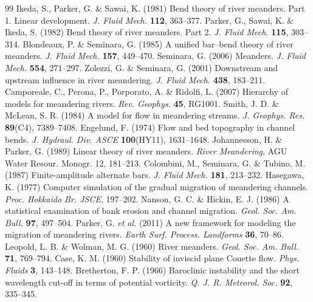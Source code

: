 \documentclass[11pt]{article}
\begin{document}
\begin{thebibliography}{99}
 Ikeda, S., Parker, G. \& Sawai, K. (1981) Bend theory of river
  meanders. Part 1. Linear development. \emph{J. Fluid Mech.} \textbf{112}, 363--377.
 Parker, G., Sawai, K. \& Ikeda, S. (1982) Bend theory of river
  meanders. Part 2. \emph{J. Fluid Mech.} \textbf{115}, 303--314.
 Blondeaux, P. \& Seminara, G. (1985) A unified bar--bend
  theory of river meanders. \emph{J. Fluid Mech.} \textbf{157}, 449--470.
 Seminara, G. (2006) Meanders. \emph{J. Fluid Mech.}
  \textbf{554}, 271--297.
 Zolezzi, G. \& Seminara, G. (2001) Downstream and upstream
  influence in river meandering. \emph{J. Fluid Mech.} \textbf{438}, 183--211.
 Camporeale, C., Perona, P., Porporato, A. \& Ridolfi, L.
  (2007) Hierarchy of models for meandering rivers. \emph{Rev. Geophys.} \textbf{45}, RG1001.
 Smith, J. D. \& McLean, S. R. (1984) A model for flow in
  meandering streams. \emph{J. Geophys. Res.} \textbf{89}(C4), 7389--7408.
 Engelund, F. (1974) Flow and bed topography in channel bends.
  \emph{J. Hydraul. Div. ASCE} \textbf{100}(HY11), 1631--1648.
 Johannesson, H. \& Parker, G. (1989) Linear theory of river
  meanders. \emph{River Meandering}, AGU Water Resour. Monogr. 12, 181--213.
 Colombini, M., Seminara, G. \& Tubino, M. (1987)
  Finite-amplitude alternate bars. \emph{J. Fluid Mech.} \textbf{181}, 213--232.
 Hasegawa, K. (1977) Computer simulation of the gradual
  migration of meandering channels. \emph{Proc. Hokkaido Br. JSCE}, 197--202.
 Nanson, G. C. \& Hickin, E. J. (1986) A statistical examination
  of bank erosion and channel migration. \emph{Geol. Soc. Am. Bull.} \textbf{97}, 497--504.
 Parker, G. \emph{et al.} (2011) A new framework for modeling the
  migration of meandering rivers. \emph{Earth Surf. Process. Landforms} \textbf{36}, 70--86.
 Leopold, L. B. \& Wolman, M. G. (1960) River meanders.
  \emph{Geol. Soc. Am. Bull.} \textbf{71}, 769--794.
 Case, K. M. (1960) Stability of inviscid plane Couette flow.
  \emph{Phys. Fluids} \textbf{3}, 143--148.
 Bretherton, F. P. (1966) Baroclinic instability and the
  short wavelength cut-off in terms of potential vorticity. \emph{Q. J. R. Meteorol.
  Soc.} \textbf{92}, 335--345.
\end{thebibliography}
\end{document}
